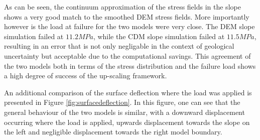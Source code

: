 As can be seen, the continuum approximation of the stress fields in the slope shows a very good match to the smoothed DEM stress fields. More importantly however is the load at failure for the two models were very close. The DEM slope simulation failed at $11.2 MPa$, while the CDM slope simulation failed at $11.5 MPa$, resulting in an error that is not only negligable in the context of geological uncertainty but acceptable due to the computational savings. This agreement of the two models both in terms of the stress distribution and the failure load shows a high degree of success of the up-scaling framework. 

An additional comparison of the surface deflection where the load was applied is presented in Figure \ref{fig:surfacedeflection}. In this figure, one can see that the general behaviour of the two models is similar, with a downward displacement occurring where the load is applied, upwards displacement towards the slope on the left and negligible displacement towards the right model boundary. 